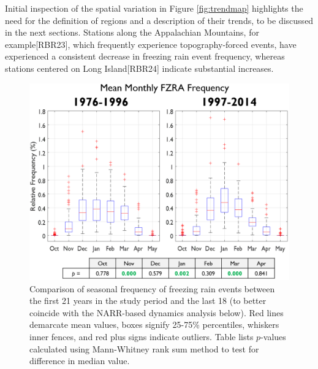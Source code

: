 \documentclass[twocol]{ametsoc}
\begin{document}



Initial inspection of the spatial variation in Figure \ref{fig:trendmap} highlights the need for the definition of regions and a description of their trends, to be discussed in the next sections. Stations along the Appalachian Mountains, for example[RBR23], which frequently experience topography-forced events, have experienced a consistent decrease in freezing rain event frequency, whereas stations centered on Long Island[RBR24] indicate substantial increases.  



\begin{figure}

\centering

\includegraphics[width=.9\textwidth]{Seasonal.PNG}

\caption{\label{fig:seasonal} Comparison of seasonal frequency of freezing rain events between the first 21 years in the study period and the last 18 (to better coincide with the NARR-based dynamics analysis below). Red lines demarcate mean values, boxes signify 25-75\% percentiles, whiskers inner fences, and red plus signs indicate outliers. Table lists $p$-values calculated using Mann-Whitney rank sum method to test for difference in median value.}

\end{figure}

\end{document}
